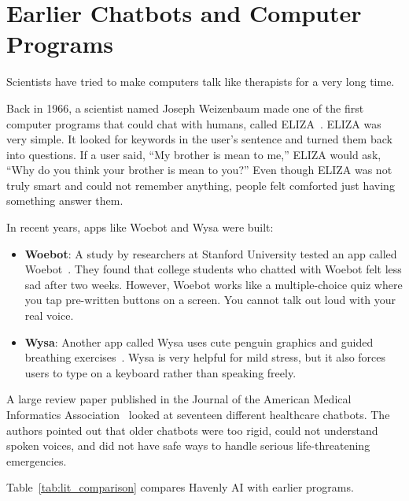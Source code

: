 \section{Earlier Chatbots and Computer Programs}
\label{sec:lit_conversational_agents}

Scientists have tried to make computers talk like therapists for a very long time.

Back in 1966, a scientist named Joseph Weizenbaum made one of the first computer programs that could chat with humans, called ELIZA~\cite{weizenbaum1966eliza}. ELIZA was very simple. It looked for keywords in the user's sentence and turned them back into questions. If a user said, ``My brother is mean to me,'' ELIZA would ask, ``Why do you think your brother is mean to you?'' Even though ELIZA was not truly smart and could not remember anything, people felt comforted just having something answer them.

In recent years, apps like Woebot and Wysa were built:
\begin{itemize}
    \item \textbf{Woebot}: A study by researchers at Stanford University tested an app called Woebot~\cite{fitzpatrick2017delivering}. They found that college students who chatted with Woebot felt less sad after two weeks. However, Woebot works like a multiple-choice quiz where you tap pre-written buttons on a screen. You cannot talk out loud with your real voice.
    \item \textbf{Wysa}: Another app called Wysa uses cute penguin graphics and guided breathing exercises~\cite{inkster2018empathy}. Wysa is very helpful for mild stress, but it also forces users to type on a keyboard rather than speaking freely.
\end{itemize}

A large review paper published in the Journal of the American Medical Informatics Association~\cite{laranjo2018conversational} looked at seventeen different healthcare chatbots. The authors pointed out that older chatbots were too rigid, could not understand spoken voices, and did not have safe ways to handle serious life-threatening emergencies.

Table~\ref{tab:lit_comparison} compares Havenly AI with earlier programs.

